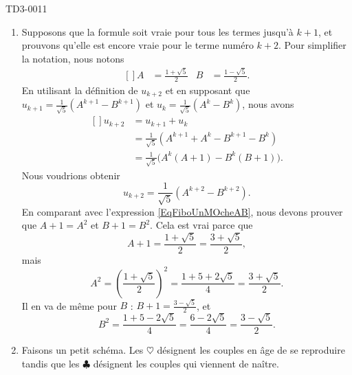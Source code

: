 
\begin{corrige}{TD3-0011}

	\begin{enumerate}
		\item
			Supposons que la formule soit vraie pour tous les termes jusqu'à $k+1$, et prouvons qu'elle est encore vraie pour le terme numéro $k+2$. Pour simplifier la notation, nous notons
			\begin{equation}
				\begin{aligned}[]
					A&=\frac{ 1+\sqrt{5} }{2}	&B&=\frac{ 1-\sqrt{5} }{2}.
				\end{aligned}
			\end{equation}
			En utilisant la définition de $u_{k+2}$ et en supposant que $u_{k+1}=\frac{1}{ \sqrt{5} }(A^{k+1}-B^{k+1})$ et $u_k=\frac{1}{ \sqrt{5} }(A^k-B^k)$, nous avons
			\begin{equation}		\label{EqFiboUnMOcheAB}
				\begin{aligned}[]
					u_{k+2}&=u_{k+1}+u_k\\
					&=\frac{1}{ \sqrt{5} }(A^{k+1}+A^k-B^{k+1}-B^{k})\\
					&=\frac{1}{ \sqrt{5} }\big( A^k(A+1)-B^k(B+1) \big).
				\end{aligned}
			\end{equation}
			Nous voudrions obtenir
			\begin{equation}
				u_{k+2}=\frac{1}{ \sqrt{5} }(A^{k+2}-B^{k+2}).
			\end{equation}
			En comparant avec l'expression \eqref{EqFiboUnMOcheAB}, nous devons prouver que $A+1=A^2$ et $B+1=B^2$. Cela est vrai parce que
			\begin{equation}
				A+1=\frac{ 1+\sqrt{5} }{ 2 }=\frac{ 3+\sqrt{5} }{2},
			\end{equation}
			mais
			\begin{equation}
				A^2=\left( \frac{ 1+\sqrt{5} }{2} \right)^2=\frac{ 1+5+2\sqrt{5} }{ 4 }=\frac{ 3+\sqrt{5} }{2}.
			\end{equation}
			Il en va de même pour $B$ : $B+1=\frac{ 3-\sqrt{5} }{2}$, et
			\begin{equation}
				B^2=\frac{ 1+5-2\sqrt{5} }{ 4 }=\frac{ 6-2\sqrt{5} }{ 4 }=\frac{ 3-\sqrt{5} }{ 2 }.
			\end{equation}
		\item
			Faisons un petit schéma. Les $\heartsuit$ désignent les couples en âge de se reproduire tandis que les $\clubsuit$ désignent les couples qui viennent de naître.

\end{enumerate}
\end{corrige}
